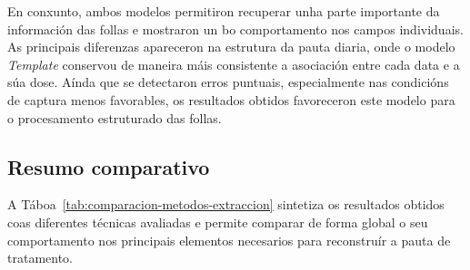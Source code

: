 En conxunto, ambos modelos permitiron recuperar unha parte importante da información das follas e mostraron un bo comportamento nos campos individuais. As principais diferenzas apareceron na estrutura da pauta diaria, onde o modelo \textit{Template} conservou de maneira máis consistente a asociación entre cada data e a súa dose. Aínda que se detectaron erros puntuais,
especialmente nas condicións de captura menos favorables, os resultados obtidos favoreceron este modelo para o procesamento estruturado das follas.

\subsection{Resumo comparativo}

A Táboa~\ref{tab:comparacion-metodos-extraccion} sintetiza os resultados obtidos coas diferentes técnicas avaliadas e permite comparar de forma global
o seu comportamento nos principais elementos necesarios para reconstruír a pauta de tratamento.
